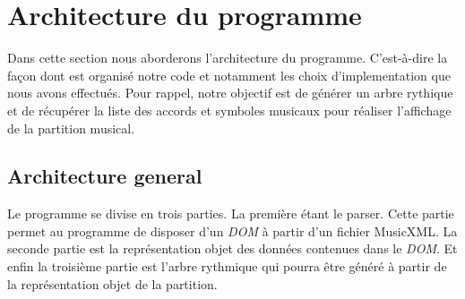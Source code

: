 \section{Architecture du programme}
\par
Dans cette section nous aborderons l'architecture du programme. C'est-à-dire
la façon dont est organisé notre code et notamment les choix d'implementation
que nous avons effectués. Pour rappel, notre objectif est de générer un arbre rythique
et de récupérer la liste des accords et symboles musicaux pour réaliser l'affichage
de la partition musical.

\subsection{Architecture general}
\par
Le programme se divise en trois parties. La première étant le parser. Cette partie
permet au programme de disposer d'un \emph{DOM} à partir d'un fichier MusicXML.
La seconde partie est la représentation objet des données contenues dans le \emph{DOM}.
Et enfin la troisième partie est l'arbre rythmique qui pourra être généré à partir
de la représentation objet de la partition.

